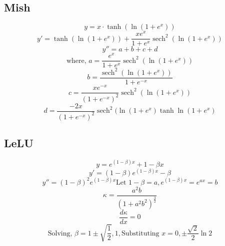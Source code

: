 \documentclass{article}
\begin{document}
\subsection{Mish}\label{app:mish}
\begin{displaymath}
y = x \cdot \tanh\!\left(\ln(1 + e^{x})\right)
\end{displaymath}
\begin{displaymath}
y' = \tanh{(\ln{(1 + e^x)})} + \frac{xe^x}{1 + e^x}\operatorname{sech}^2(\ln{(1 + e^x)})
\end{displaymath}
\begin{displaymath}
  y'' = a + b + c + d
\end{displaymath}
\begin{displaymath}
  \text{where, } a = \frac{e^x}{1 + e^x}\operatorname{sech}^2(\ln{(1 + e^x)})
\end{displaymath}
\begin{displaymath}
  b = \frac{\operatorname{sech}^2(\ln{(1 + e^x)})}{1+e^{-x}} 
\end{displaymath}
\begin{displaymath}
  c = \frac{xe^{-x}}{(1 + e^{-x})^2} \operatorname{sech}^2(\ln{(1 + e^x)})
\end{displaymath}
\begin{displaymath}
  d = \frac{-2x}{(1 + e^{-x})^2} \operatorname{sech}^2(\ln{(1 + e^x)} \tanh{\ln{(1 + e^x)}}
\end{displaymath}

\subsection{LeLU}\label{app:LeLU}

\begin{displaymath}
y = e^{(1 - \beta)x} + 1 - \beta x
\end{displaymath}
\begin{displaymath}
y' = (1 - \beta)e^{(1 - \beta)x} - \beta
\end{displaymath}
\begin{displaymath}
y'' = (1 - \beta)^2e^{(1 - \beta)x}
\text{Let }1 - \beta = a, e^{(1 - \beta)x} = e^{ax} = b
\end{displaymath}
\begin{displaymath}
\kappa = \frac{a^2b}{(1 + a^2b^{2})^\frac{3}{2}}
\end{displaymath}
\begin{displaymath}
\frac{d \kappa}{dx} = 0
\end{displaymath}
\begin{displaymath}
\text{Solving, }\beta = 1 \pm \sqrt{\frac{1}{2}}, 1, \text{Substituting }x = 0, \pm \frac{\sqrt{2}}{2}\ln2
\end{displaymath}
\end{document}
